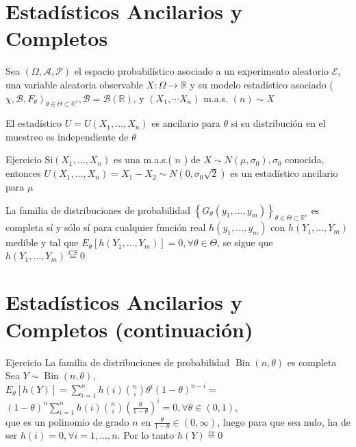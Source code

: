 \section*{Estadísticos Ancilarios y Completos}
Sea $(\Omega, \mathcal{A}, \mathcal{P})$ el espacio probabilístico asociado a un experimento aleatorio $\mathcal{E}$, una variable aleatoria observable $X: \Omega \longrightarrow \mathbb{R}$ y su modelo estadístico asociado ( $\left.\chi, \mathcal{B}, F_{\theta}\right)_{\theta \in \Theta \subset \mathbb{R}^{\ell}}, \mathcal{B}=\mathcal{B}(\mathbb{R})$, y $\left(X_{1}, \cdots X_{n}\right)$ m.a.s. $(n) \sim X$

El estadístico $U=U\left(X_{1}, \ldots, X_{n}\right)$ es ancilario para $\theta$ si su distribución en el muestreo es independiente de $\theta$

Ejercicio $\mathrm{Si}\left(X_{1}, \ldots, X_{n}\right)$ es una m.a.s.( $n$ ) de $X \sim N\left(\mu, \sigma_{0}\right), \sigma_{0}$ conocida, entonces $U\left(X_{1}, \ldots, X_{n}\right)=X_{1}-X_{2} \sim N\left(0, \sigma_{0} \sqrt{2}\right)$ es un estadístico ancilario para $\mu$

La familia de distribuciones de probabilidad $\left\{G_{\theta}\left(y_{1}, \ldots, y_{m}\right)\right\}_{\theta \in \Theta \subset \mathbb{R}^{e}}$ es completa sí y sólo sí para cualquier función real $h\left(y_{1}, \ldots, y_{m}\right)$ con $h\left(Y_{1}, \ldots, Y_{m}\right)$ medible y tal que $E_{\theta}\left[h\left(Y_{1}, \ldots, Y_{m}\right)\right]=0, \forall \theta \in \Theta$, se sigue que $h\left(Y_{1}, \ldots, Y_{m}\right) \stackrel{C S}{=} 0$

\section*{Estadísticos Ancilarios y Completos (continuación)}
Ejercicio La familia de distribuciones de probabilidad $\operatorname{Bin}(n, \theta)$ es completa\\
Sea $Y \sim \operatorname{Bin}(n, \theta)$,\\
$E_{\theta}[h(Y)]=\sum_{i=1}^{n} h(i)\binom{n}{i} \theta^{i}(1-\theta)^{n-i}=$\\
$(1-\theta)^{n} \sum_{i=1}^{n} h(i)\binom{n}{i}\left(\frac{\theta}{1-\theta}\right)^{i}=0, \forall \theta \in(0,1)$,\\
que es un polinomio de grado $n$ en $\frac{\theta}{1-\theta} \in(0, \infty)$, luego para que sea nulo, ha de ser $h(i)=0, \forall i=1, \ldots, n$. Por lo tanto $h(Y) \stackrel{c s}{=} 0$

